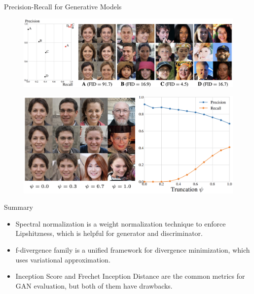 \begin{frame}{Precision-Recall for Generative Models}
	\begin{figure}
		\includegraphics[width=\linewidth]{figs/pr_vs_fid}
	\end{figure}
	\begin{figure}
		\includegraphics[width=0.75\linewidth]{figs/pr_truncation}
	\end{figure}
\end{frame}
\begin{frame}{Summary}
	\begin{itemize}
		\item Spectral normalization is a weight normalization technique to enforce Lipshitzness, which is helpful for generator and discriminator.
		\vfill
		\item f-divergence family is a unified framework for divergence minimization, which uses variational approximation.
		\vfill
		\item Inception Score and Frechet Inception Distance are the common metrics for GAN evaluation, but both of them have drawbacks.
	\end{itemize}
\end{frame}
 